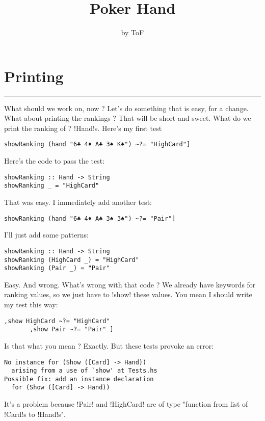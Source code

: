 \documentclass[a4paper,10pt]{article}
\title{Poker Hand}
\author{by ToF}
\begin{document}
\newpage
\section{Printing} 
\vspace{10cm}
\hrule

\lhQ What should we work on, now ?
\lhA Let's do something that is easy, for a change.
\lhN What about printing the rankings ?
\lhA That will be short and sweet.
\lhN What do we print the ranking of ?
\lhA \il!Hand!s.
\lhN Here's my first test
\begin{lstlisting}[frame=single]
 showRanking (hand "6♣ 4♦ A♣ 3♠ K♠") ~?= "HighCard"]
\end{lstlisting} %
\lhA Here's the code to pass the test:
\begin{lstlisting}[frame=single]
showRanking :: Hand -> String
showRanking _ = "HighCard"
\end{lstlisting}
\success That was easy.
\lhN I immediately add another test:
\begin{lstlisting}[frame=single]
 showRanking (hand "6♣ 4♦ A♣ 3♠ 3♠") ~?= "Pair"]
\end{lstlisting}
\lhA I'll just add some patterns:
\begin{lstlisting}[frame=single]
showRanking :: Hand -> String
showRanking (HighCard _) = "HighCard"
showRanking (Pair _) = "Pair"
\end{lstlisting}
\success Easy. And wrong.
\lhN What's wrong with that code ?
\lhA We already have keywords for ranking values, so we just have to \il!show! these values.
\lhN You mean I should write my test this way:
\begin{lstlisting}[frame=single]
       ,show HighCard ~?= "HighCard"
       ,show Pair ~?= "Pair" ]
\end{lstlisting}
Is that what you mean ?
\lhA \error Exactly.
\lhN But these tests provoke an error:
\begin{small}
\begin{verbatim}
No instance for (Show ([Card] -> Hand))
  arising from a use of `show' at Tests.hs
Possible fix: add an instance declaration 
  for (Show ([Card] -> Hand))
\end{verbatim}
\end{small}
\lhA It's a problem because \il!Pair! and \il!HighCard! are of type "function from list of \il!Card!s to \il!Hand!s". 
\end{document}
